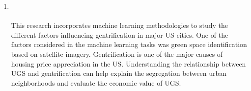 \documentclass{article}
\begin{document}
\begin{enumerate}
     \item  {}\\ \\ This research incorporates machine learning methodologies to study the different factors influencing gentrification in major US cities. One of the factors considered in the machine learning tasks was green space identification based on satellite imagery. Gentrification is one of the major causes of housing price appreciation in the US. Understanding the relationship between UGS and gentrification can help explain the segregation between urban neighborhoods and evaluate the economic value of UGS.
\end{enumerate}
\end{document}
